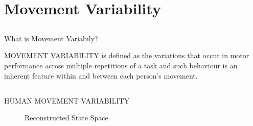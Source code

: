 
\section{Movement Variability}


\subsection{}
{


\begin{frame}{What is Movement Variabily?}

\LARGE
MOVEMENT VARIABILITY is defined as the variations that occur in motor
performance across multiple repetitions of a task and such behaviour is 
an inherent feature within and between each person's movement.
\end{frame}
}


\subsection{}
{

\begin{frame}{HUMAN MOVEMENT VARIABILITY}
    \begin{figure}
	\caption{Reconstructed State Space} 
   \end{figure}
	
\end{frame}
}


